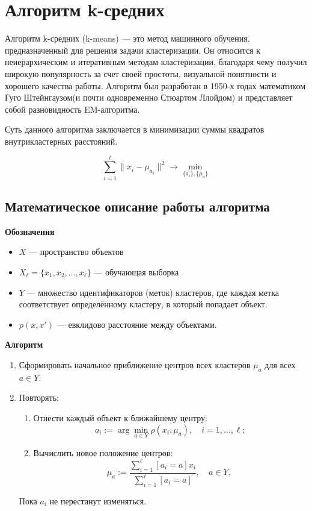 \section{Алгоритм k-средних}

Алгоритм k-средних (k-means) — это метод машинного обучения, предназначенный для решения задачи кластеризации. Он относится к неиерархическим и итеративным методам кластеризации, благодаря чему получил широкую популярность за счет своей простоты, визуальной понятности и хорошего качества работы. Алгоритм был разработан в 1950-х годах математиком Гуго Штейнгаузом(и почти одновременно Стюартом Ллойдом) и представляет собой разновидность EM-алгоритма. 

Суть данного алгоритма заключается в минимизации суммы квадратов внутрикластерных расстояний. 

\[
\sum_{i=1}^\ell \|x_i - \mu_{a_i}\|^2 \to \min_{\{a_i\}, \{\mu_a\}}
\]

\subsection{Математическое описание работы алгоритма}
\textbf{Обозначения}
\begin{itemize}
    \item \( X \) — пространство объектов
    \item \( X_\ell = \{ x_1, x_2, \ldots, x_\ell \} \) — обучающая выборка
    \item \( Y \) — множество идентификаторов (меток) кластеров, где каждая метка соответствует определённому кластеру, в который попадает объект.
    \item \( \rho(x, x') \) — евклидово расстояние между объектами.
\end{itemize}

\textbf{Алгоритм}
\begin{enumerate}
    \item Сформировать начальное приближение центров всех кластеров  $\mu_a$ для всех ${a \in Y}$.
    \item Повторять:
    \begin{enumerate}
        \item Отнести каждый объект к ближайшему центру:  
        \[
        a_i := \arg \min_{a \in Y} \rho(x_i, \mu_a), \quad i = 1, \ldots, \ell;
        \]
        \item Вычислить новое положение центров:  
        \[
        \mu_{a} := \frac{\sum_{i=1}^\ell [a_i = a] x_i}{\sum_{i=1}^\ell [a_i = a]}, 
        \quad a \in Y, \; 
        \]
    \end{enumerate}
    Пока $a_i$ не перестанут изменяться.
\end{enumerate}

